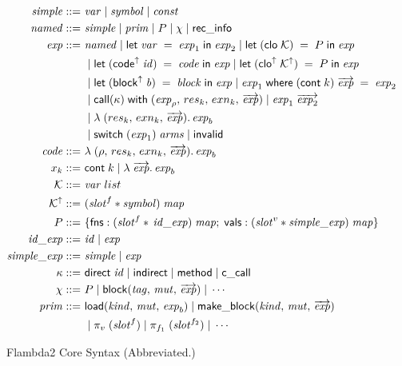\documentclass[11pt,fleqn]{amsart}
\begin{document}
\newcommand{\eval}[2]{\langle #1, \, #2\rangle}
\newcommand{\rebind}[3]{#1 \; [ #2 \mapsto #3 ]}

\begin{figure}[ht]
  \footnotesize
  \begin{align*}
    \mathit{simple} ::=~& \mathit{var} \; | \; \mathit{symbol} \; | \; \mathit{const} \\
    \mathit{named} ::=~& \mathit{simple} \; | \; \mathit{prim} \; | \; P \; | \; \chi \; | \; \mathsf{rec\_info} \\
    \mathit{exp} ::=~& \mathit{named} \; | \; \mathsf{let}\; \mathit{var} \; = \; \mathit{exp}_1 \; \mathsf{in} \; \mathit{exp}_2 \; | \; \mathsf{let}\; (\mathsf{clo} \; \mathcal{K}) \; = \; P \; \mathsf{in} \; \mathit{exp}\\
    & \; | \; \mathsf{let}\; (\mathsf{code}^{\uparrow} \; \mathit{id}) \; = \; \mathit{code} \; \mathsf{in} \; \mathit{exp} \; | \; \mathsf{let}\; (\mathsf{clo}^{\uparrow} \; \mathcal{K}^{\uparrow}) \; = \; P \; \mathsf{in} \; \mathit{exp} \\
    & \; | \; \mathsf{let}\; (\mathsf{block}^{\uparrow} \; \mathit{b}) \; = \; \mathit{block} \; \mathsf{in} \; \mathit{exp} \; | \; \mathit{exp}_1 \; \mathsf{where} \; (\mathsf{cont}\; k) \; \overrightarrow{\mathit{exp}} \; = \; \mathit{exp}_2 \\
    & \; | \; \mathsf{call}(\kappa) \; \mathsf{with} \; (\mathit{exp}_{\rho}, \, res_k, \, exn_k, \, \overrightarrow{\mathit{exp}}) \; | \; \mathit{exp}_1 \; \overrightarrow{\mathit{exp}_2} \\
    & \; | \; \lambda \; (res_k,\, exn_k,\, \overrightarrow{\mathit{exp}}).\, \mathit{exp}_b\\
    & \; | \; \mathsf{switch}\; (\mathit{exp}_1) \; \mathit{arms} \; | \; \mathsf{invalid} \\
    \mathit{code} ::=~& \lambda \; (\rho,\, res_k,\, exn_k,\, \overrightarrow{\mathit{exp}}).\, \mathit{exp}_b \\
    x_k ::=~& \mathsf{cont}\; k \; | \; \lambda \; \overrightarrow{\mathit{exp}}.\, \mathit{exp}_b \\
    \mathcal{K} ::=~& \mathit{var} \; list \\
    \mathcal{K}^{\uparrow} ::=~& (\mathit{slot}^{f} \ast \mathit{symbol}) \; \mathit{map} \\
    P ::=~& \{ \mathsf{fns} : (\mathit{slot}^{f} \ast \, \mathit{id\_exp} ) \; \mathit{map} ; \;
    \mathsf{vals} : (\mathit{slot}^{v} \ast \mathit{simple\_exp}) \; \mathit{map} \}\\
    \mathit{id\_exp} ::=~& \mathit{id} \; | \; \mathit{exp} \\
    \mathit{simple\_exp} ::=~& \mathit{simple} \; | \; \mathit{exp} \\
    \kappa ::=~& \mathsf{direct} \; \mathit{id} \; | \; \mathsf{indirect} \; | \; \mathsf{method} \; | \; \mathsf{c\_call} \\
    \chi ::=~& P \; | \; \mathsf{block}(\mathit{tag},\,\mathit{mut},\,\overrightarrow{\mathit{exp}}) \; | \; \cdots \\
    \mathit{prim} ::=~& \mathsf{load}(\mathit{kind},\,\mathit{mut},\,\mathit{exp}_b) \; | \; \mathsf{make\_block}(\mathit{kind},\,\mathit{mut},\,\overrightarrow{\mathit{exp}}) \\
    & \; | \; \pi_{v} \; (\mathit{slot}^{f}) \; | \; \pi_{f_1} \; (\mathit{slot}^{f_2}) \; | \; \cdots
  \end{align*}
  \caption{Flambda2 Core Syntax (Abbreviated.) }
  \label{fig:syntax}
\end{figure}
\end{document}

